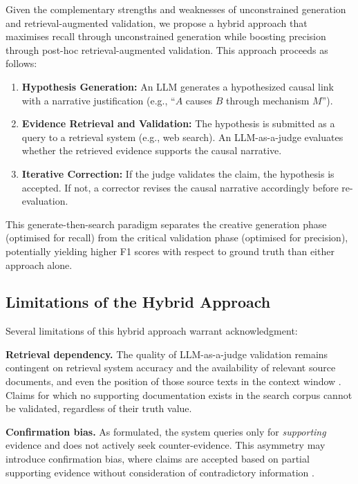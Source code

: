 Given the complementary strengths and weaknesses of unconstrained generation and retrieval-augmented validation, we propose a hybrid approach that maximises recall through unconstrained generation while boosting precision through post-hoc retrieval-augmented validation. This approach proceeds as follows:

\begin{enumerate}
    \item \textbf{Hypothesis Generation:} An LLM generates a hypothesized causal link with a narrative justification (e.g., ``$A$ causes $B$ through mechanism $M$'').
    
    \item \textbf{Evidence Retrieval and Validation:} The hypothesis is submitted as a query to a retrieval system (e.g., web search). An LLM-as-a-judge evaluates whether the retrieved evidence supports the causal narrative.
    
    \item \textbf{Iterative Correction:} If the judge validates the claim, the hypothesis is accepted. If not, a corrector revises the causal narrative accordingly before re-evaluation.
\end{enumerate}

This generate-then-search paradigm separates the creative generation phase (optimised for recall) from the critical validation phase (optimised for precision), potentially yielding higher F1 scores with respect to ground truth than either approach alone.

\subsection{Limitations of the Hybrid Approach}

Several limitations of this hybrid approach warrant acknowledgment:

\noindent\textbf{Retrieval dependency.} The quality of LLM-as-a-judge validation remains contingent on retrieval system accuracy and the availability of relevant source documents, and even the position of those source texts in the context window \citep{liu2023lostmiddle}. Claims for which no supporting documentation exists in the search corpus cannot be validated, regardless of their truth value.

\noindent\textbf{Confirmation bias.} As formulated, the system queries only for \textit{supporting} evidence and does not actively seek counter-evidence. This asymmetry may introduce confirmation bias, where claims are accepted based on partial supporting evidence without consideration of contradictory information \citep{nickerson1998confirmationbias}.

